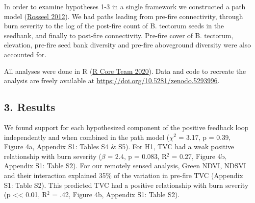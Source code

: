 \documentclass[
  12pt,
]{article}
\begin{document}
In order to examine hypotheses 1-3 in a single framework we constructed
a path model (\protect\hyperlink{ref-Rosseel2012}{Rosseel 2012}). We had
paths leading from pre-fire connectivity, through burn severity to the
log of the post-fire count of B. tectorum seeds in the seedbank, and
finally to post-fire connectivity. Pre-fire cover of B. tectorum,
elevation, pre-fire seed bank diversity and pre-fire aboveground
diversity were also accounted for.

All analyses were done in R (\protect\hyperlink{ref-R}{R Core Team
2020}). Data and code to recreate the analysis are freely available at
\url{https://doi.org/10.5281/zenodo.5293996}.

\hypertarget{results}{%
\subsection{3. Results}\label{results}}

We found support for each hypothesized component of the positive
feedback loop independently and when combined in the path model
(\(\chi^2\) = 3.17, p = 0.39, Figure 4a, Appendix S1: Tables S4 \& S5).
For H1, TVC had a weak positive relationship with burn severity
(\(\beta\) = 2.4, p = 0.083, R\(^2\) = 0.27, Figure 4b, Appendix S1:
Table S2). For our remotely sensed analysis, Green NDVI, NDSVI and their
interaction explained 35\% of the variation in pre-fire TVC (Appendix
S1: Table S2). This predicted TVC had a positive relationship with burn
severity (p \textless\textless{} 0.01, R\(^2\) = .42, Figure 4b,
Appendix S1: Table S2).
\end{document}
